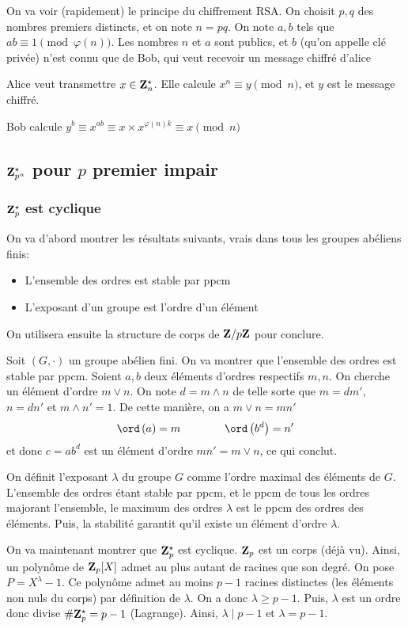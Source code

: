 On va voir (rapidement) le principe du chiffrement RSA. On choisit $p, q$ des nombres premiers distincts, et on note $n=pq$. On note $a, b$ tels que $ab\equiv 1\pmod{\varphi(n)}$. Les nombres $n$ et $a$ sont publics, et $b$ (qu'on appelle clé privée) n'est connu que de Bob, qui veut recevoir un message chiffré d'alice

Alice veut transmettre $x\in\mathbf Z_n^\star$. Elle calcule $x^n\equiv y\pmod n$, et $y$ est le message chiffré.

Bob calcule $y^b\equiv x^{ab}\equiv x\times x^{\varphi(n)k}\equiv x\pmod n$

\subsection{$\mathbf Z_{p^\alpha}^\star$ pour $p$ premier impair}

\subsubsection{$\mathbf Z_p^\star$ est cyclique}

On va d'abord montrer les résultats suivants, vrais dans tous les groupes abéliens finis: \begin{itemize}
    \item L'ensemble des ordres est stable par ppcm
    \item L'exposant d'un groupe est l'ordre d'un élément
\end{itemize}
On utilisera ensuite la structure de corps de $\mathbf Z/p\mathbf Z$ pour conclure.

Soit $(G, \cdot)$ un groupe abélien fini. On va montrer que l'ensemble des ordres est stable par ppcm. Soient $a, b$ deux éléments d'ordres respectifs $m, n$. On cherche un élément d'ordre $m\lor n$. On note $d=m\land n$ de telle sorte que $m=dm'$, $n=dn'$ et $m\land n'=1$. De cette manière, on a $m\lor n=mn'$
\[
    \ord \left(a\right)=m\qquad \qquad \ord\left(b^d\right)=n'
\]
et donc $c=ab^d$ est un élément d'ordre $mn'=m\lor n$, ce qui conclut.

On définit l'exposant $\lambda$ du groupe $G$ comme l'ordre maximal des éléments de $G$. L'ensemble des ordres étant stable par ppcm, et le ppcm de tous les ordres majorant l'ensemble, le maximum des ordres $\lambda$ est le ppcm des ordres des éléments. Puis, la stabilité garantit qu'il existe un élément d'ordre $\lambda$.

On va maintenant montrer que $\mathbf Z_p^\star$ est cyclique. $\mathbf Z_p$ est un corps (déjà vu). Ainsi, un polynôme de $\mathbf Z_p[X]$ admet au plus autant de racines que son degré. On pose $P=X^\lambda-1$. Ce polynôme admet au moins $p-1$ racines distinctes (les éléments non nuls du corps) par définition de $\lambda$. On a donc $\lambda\geq p-1$. Puis, $\lambda$ est un ordre donc divise $\#\mathbf Z_p^\star=p-1$ (Lagrange). Ainsi, $\lambda\mid p-1$ et $\lambda=p-1$.

